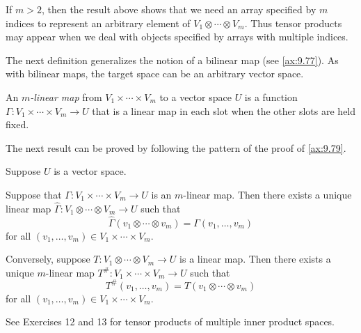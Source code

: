 If $m>2$, then the result above shows that we need an array specified by $m$
indices to represent an arbitrary element of $V_1\otimes\cdots\otimes V_m$.
Thus tensor products may appear when we deal with objects specified by arrays
with multiple indices.

The next definition generalizes the notion of a bilinear map (see
\ref{ax:9.77}). As with bilinear maps, the target space can be an arbitrary
vector space.

\begin{definition}\label{ax:9.91}
An \emph{$m$-linear map} from $V_1\times\cdots\times V_m$ to a vector space $U$
is a function $\Gamma\colon V_1\times\cdots\times V_m\to U$ that is a linear
map in each slot when the other slots are held fixed.
\end{definition}

The next result can be proved by following the pattern of the proof of
\ref{ax:9.79}.

\begin{result}\label{ax:9.92}
Suppose $U$ is a vector space.
\begin{parts}
\item Suppose that $\Gamma\colon V_1\times\cdots\times V_m\to U$ is an
  $m$-linear map. Then there exists a unique linear map
  $\hat\Gamma\colon V_1\otimes\cdots\otimes V_m\to U$ such that
  \[ \hat\Gamma(v_1\otimes\cdots\otimes v_m) = \Gamma(v_1,\dots,v_m) \]
  for all $(v_1,\dots,v_m)\in V_1\times\cdots\times V_m$.
\item Conversely, suppose $T\colon V_1\otimes\cdots\otimes V_m\to U$ is a
  linear map. Then there exists a unique $m$-linear map
  $T^\#\colon V_1\times\cdots\times V_m\to U$ such that
  \[ T^\#(v_1,\dots,v_m) = T(v_1\otimes\cdots\otimes v_m) \]
  for all $(v_1,\dots,v_m)\in V_1\times\cdots\times V_m$.
\end{parts}
\end{result}

See Exercises 12 and 13 for tensor products of multiple inner product spaces.

